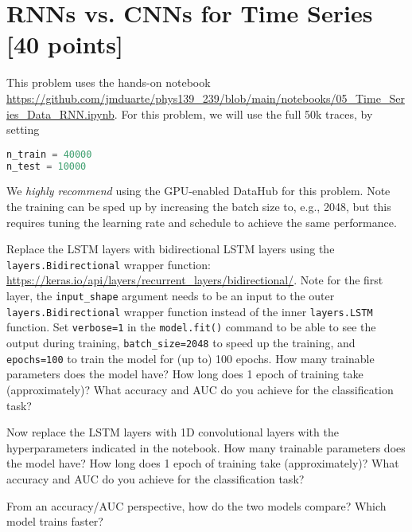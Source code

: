 \section{RNNs vs. CNNs for Time Series [40 points]}

This problem uses the hands-on notebook \url{https://github.com/jmduarte/phys139_239/blob/main/notebooks/05_Time_Series_Data_RNN.ipynb}.
For this problem, we will use the full 50k traces, by setting
\begin{lstlisting}[language=python]
n_train = 40000
n_test = 10000
\end{lstlisting}
We \emph{highly recommend} using the GPU-enabled DataHub for this problem.
Note the training can be sped up by increasing the batch size to, e.g., 2048, but this requires tuning the learning rate and schedule to achieve the same performance.

\begin{problem}[15]
Replace the LSTM layers with bidirectional LSTM layers using the \texttt{layers.Bidirectional} wrapper function: \url{https://keras.io/api/layers/recurrent_layers/bidirectional/}.
Note for the first layer, the \texttt{input_shape} argument needs to be an input to the outer \texttt{layers.Bidirectional} wrapper function instead of the inner \texttt{layers.LSTM} function.
Set \texttt{verbose=1} in the \texttt{model.fit()} command to be able to see the output during training, \texttt{batch\_size=2048} to speed up the training, and \texttt{epochs=100} to train the model for (up to) 100 epochs.
How many trainable parameters does the model have?
How long does 1 epoch of training take (approximately)?
What accuracy and AUC do you achieve for the classification task?
\end{problem}


\begin{problem}[15]
Now replace the LSTM layers with 1D convolutional layers with the hyperparameters indicated in the notebook.
How many trainable parameters does the model have?
How long does 1 epoch of training take (approximately)?
What accuracy and AUC do you achieve for the classification task?
\end{problem}

\begin{problem}[10]
From an accuracy/AUC perspective, how do the two models compare?
Which model trains faster?
\end{problem}


